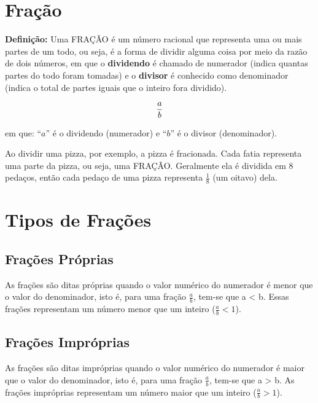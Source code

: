     \section{Fração}

    \noindent
	\textbf{Definição:} Uma FRAÇÃO é um número racional que representa uma ou mais partes de um todo, ou seja, é a forma de dividir alguma coisa por meio da razão de dois números, em que o \textbf{dividendo }é chamado de numerador (indica quantas partes do todo foram tomadas) e o \textbf{divisor} é conhecido como denominador (indica o total de partes iguais que o inteiro fora dividido).
        \begin{tcolorbox}[colback=white,colframe=minha_cor,coltitle=black,title=Definição] 
            \[
            \displaystyle\frac{a}{b}
            \]
            \end{tcolorbox}	
            \hspace{-1.2cm} em que: ``$a$'' é o dividendo (numerador) e ``$b$'' é o divisor (denominador).
            
    Ao dividir uma pizza, por exemplo, a pizza é fracionada. Cada fatia representa uma parte da pizza, ou seja, uma FRAÇÃO. Geralmente ela é dividida em 8 pedaços, então cada pedaço de uma pizza representa $\frac{1}{8}$ (um oitavo) dela.
	
	\section{Tipos de Frações}
	
	\subsection{Frações Próprias}
	As frações são ditas próprias quando o valor numérico do numerador é menor que o valor do denominador, isto é, para uma fração $\frac{a}{b}$, tem-se que a < b. Essas frações representam um número menor que um inteiro ($\frac{a}{b} < 1$).
	\begin{texample}
        \centering
        \end{texample}
        	
	\subsection{Frações Impróprias} \label{ssec:fracimpropria}
	As frações são ditas impróprias quando o valor numérico do numerador é maior que o valor do denominador, isto é, para uma fração $\frac{a}{b}$, tem-se que a > b. As frações impróprias representam um número maior que um inteiro ($\frac{a}{b} > 1$).

